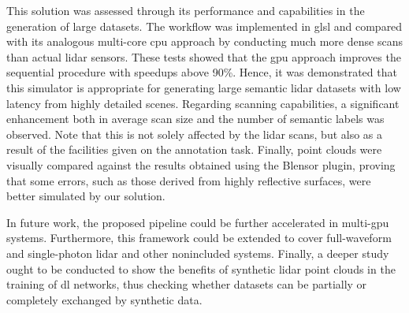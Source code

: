 This solution was assessed through its performance and capabilities in the generation of large datasets. The workflow was implemented in \acrshort{glsl} and compared with its analogous multi-core \acrshort{cpu} approach by conducting much more dense scans than actual \acrshort{lidar} sensors. These tests showed that the \acrshort{gpu} approach improves the sequential procedure with speedups above 90\%. Hence, it was demonstrated that this simulator is appropriate for generating large semantic \acrshort{lidar} datasets with low latency from highly detailed scenes. Regarding scanning capabilities, a significant enhancement both in average scan size and the number of semantic labels was observed. Note that this is not solely affected by the \acrshort{lidar} scans, but also as a result of the facilities given on the annotation task. Finally, point clouds were visually compared against the results obtained using the Blensor plugin, proving that some errors, such as those derived from highly reflective surfaces, were better simulated by our solution. 

In future work, the proposed pipeline could be further accelerated in multi-\acrshort{gpu} systems. Furthermore, this framework could be extended to cover full-waveform and single-photon \acrshort{lidar} \cite{tachella_real-time_2019} and other nonincluded systems. Finally, a deeper study ought to be conducted to show the benefits of synthetic \acrshort{lidar} point clouds in the training of \acrshort{dl} networks, thus checking whether datasets can be partially or completely exchanged by synthetic data. 